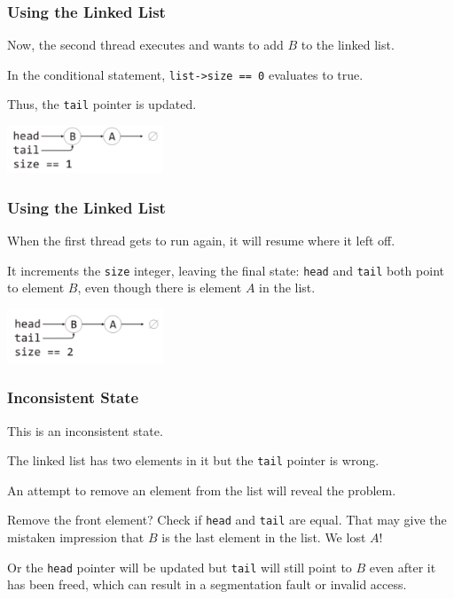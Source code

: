 \begin{frame}
	\frametitle{Using the Linked List}

	Now, the second thread executes and wants to add $B$ to the linked list.

	In the conditional statement, \texttt{list->size == 0} evaluates to true.

	Thus, the \texttt{tail} pointer is updated.

	\begin{center}
		\includegraphics[width=0.35\textwidth]{images/linkedlist2.png}
	\end{center}


\end{frame}

\begin{frame}
	\frametitle{Using the Linked List}

	When the first thread gets to run again, it will resume where it left off.

	It increments the \texttt{size} integer, leaving the final state: \texttt{head} and \texttt{tail} both point to element $B$, even though there is element $A$ in the list.

	\begin{center}
		\includegraphics[width=0.35\textwidth]{images/linkedlist3.png}
	\end{center}


\end{frame}

\begin{frame}
	\frametitle{Inconsistent State}

	This is an \alert{inconsistent state}.

	The linked list has two elements in it but the \texttt{tail} pointer is wrong.

	An attempt to remove an element from the list will reveal the problem.

	Remove the front element? Check if \texttt{head} and \texttt{tail} are equal. That may give the mistaken impression that $B$ is the last element in the list. We lost $A$!

	Or the \texttt{head} pointer will be updated but \texttt{tail} will still point to $B$ even after it has been freed, which can result in a segmentation fault or invalid access.


\end{frame}

